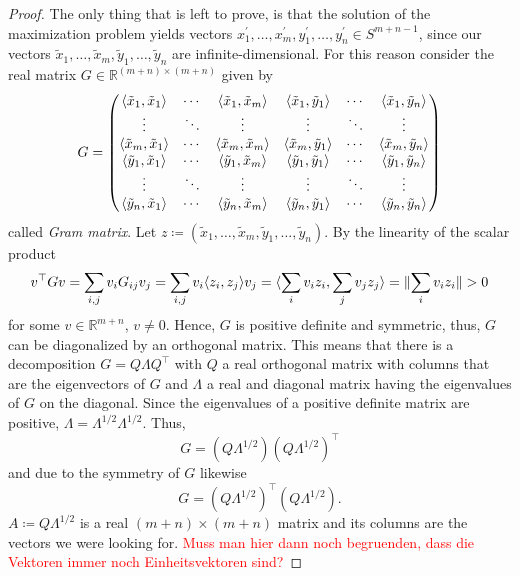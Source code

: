 \begin{proof}
	The only thing that is left to prove, is that the solution of the maximization problem yields vectors $x_1^\prime,\dots,x_m^\prime, y_1^\prime,\dots,y_n^\prime\in S^{m+n-1}$, since our vectors $\tilde{x}_1,\dots,\tilde{x}_m,\tilde{y}_1,\dots,\tilde{y}_n$ are infinite-dimensional. 
	For this reason consider the real matrix $G\in\mathbb{R}^{(m+n)\times(m+n)}$ given by
	\begin{equation}
		G=\begin{pmatrix}
			\langle{\tilde{x}_1},{\tilde{x}_1}\rangle & \cdots & \langle{\tilde{x}_1},{\tilde{x}_m}\rangle& \langle{\tilde{x}_1},{\tilde{y}_1}\rangle & \cdots & \langle{\tilde{x}_1},{\tilde{y}_n}\rangle \\
			 \vdots		& \ddots	& \vdots & \vdots & \ddots & \vdots\\
			 \langle{\tilde{x}_m},{\tilde{x}_1}\rangle & \cdots & \langle{\tilde{x}_m},{\tilde{x}_m}\rangle& \langle{\tilde{x}_m},{\tilde{y}_1}\rangle & \cdots & \langle{\tilde{x}_m},{\tilde{y}_n}\rangle \\
			\langle{\tilde{y}_1},{\tilde{x}_1}\rangle & \cdots & \langle{\tilde{y}_1},{\tilde{x}_m}\rangle& \langle{\tilde{y}_1},{\tilde{y}_1}\rangle & \cdots & \langle{\tilde{y}_1},{\tilde{y}_n}\rangle \\
			 \vdots		& \ddots	& \vdots& \vdots & \ddots & \vdots\\
			 \langle{\tilde{y}_n},{\tilde{x}_1}\rangle & \cdots & \langle{\tilde{y}_n},{\tilde{x}_m}\rangle& \langle{\tilde{y}_n},{\tilde{y}_1}\rangle & \cdots & \langle{\tilde{y}_n},{\tilde{y}_n}\rangle 
		\end{pmatrix}
	\end{equation}
	called \emph{Gram matrix}. Let $z\coloneqq (\tilde{x}_1,\dots,\tilde{x}_m,\tilde{y}_1,\dots,\tilde{y}_n)$. By the linearity of the scalar product
	\begin{align*}
		v^\top G v = \sum_{i,j} v_i G_{ij} v_j 
		= \sum_{i,j} v_i \langle{z_i},{z_j}\rangle v_j 
		= \langle{\sum_i v_i z_i},{\sum_j v_j z_j}\rangle 
		=  \Vert {\sum_i v_i z_i} \Vert > 0
	\end{align*}
	for some $v\in\mathbb{R}^{m+n}$, $v\neq 0$. Hence, $G$ is positive definite and symmetric, thus, $G$ can be diagonalized by an orthogonal matrix. This means that there is a decomposition $G=Q\Lambda Q^\top$ with $Q$ a real orthogonal matrix with columns that are the eigenvectors of $G$ and $\Lambda$ a real and diagonal matrix having the eigenvalues of $G$ on the diagonal. Since the eigenvalues of a positive definite matrix are positive, $\Lambda=\Lambda^{1/2}\Lambda^{1/2}$. Thus,
	\[
		G=(Q\Lambda^{1/2})(Q\Lambda^{1/2})^\top		
	\]
	and due to the symmetry of $G$ likewise
	\[
		G=(Q\Lambda^{1/2})^\top(Q\Lambda^{1/2}).	
	\]
	$A\coloneqq Q\Lambda^{1/2}$ is a real $(m+n)\times (m+n)$ matrix and its columns are the vectors we were looking for.
	\textcolor{red}{Muss man hier dann noch begruenden, dass die Vektoren immer noch Einheitsvektoren sind?}
\end{proof}
